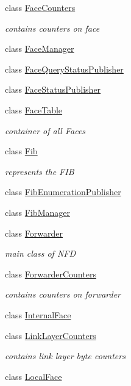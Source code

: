 \begin{DoxyCompactItemize}
class \hyperlink{classnfd_1_1FaceCounters}{Face\+Counters}
\begin{DoxyCompactList}\small\item\em contains counters on face \end{DoxyCompactList}\item 
class \hyperlink{classnfd_1_1FaceManager}{Face\+Manager}
\item 
class \hyperlink{classnfd_1_1FaceQueryStatusPublisher}{Face\+Query\+Status\+Publisher}
\item 
class \hyperlink{classnfd_1_1FaceStatusPublisher}{Face\+Status\+Publisher}
\item 
class \hyperlink{classnfd_1_1FaceTable}{Face\+Table}
\begin{DoxyCompactList}\small\item\em container of all Faces \end{DoxyCompactList}\item 
class \hyperlink{classnfd_1_1Fib}{Fib}
\begin{DoxyCompactList}\small\item\em represents the F\+IB \end{DoxyCompactList}\item 
class \hyperlink{classnfd_1_1FibEnumerationPublisher}{Fib\+Enumeration\+Publisher}
\item 
class \hyperlink{classnfd_1_1FibManager}{Fib\+Manager}
\item 
class \hyperlink{classnfd_1_1Forwarder}{Forwarder}
\begin{DoxyCompactList}\small\item\em main class of N\+FD \end{DoxyCompactList}\item 
class \hyperlink{classnfd_1_1ForwarderCounters}{Forwarder\+Counters}
\begin{DoxyCompactList}\small\item\em contains counters on forwarder \end{DoxyCompactList}\item 
class \hyperlink{classnfd_1_1InternalFace}{Internal\+Face}
\item 
class \hyperlink{classnfd_1_1LinkLayerCounters}{Link\+Layer\+Counters}
\begin{DoxyCompactList}\small\item\em contains link layer byte counters \end{DoxyCompactList}\item 
class \hyperlink{classnfd_1_1LocalFace}{Local\+Face}

\end{DoxyCompactItemize}
